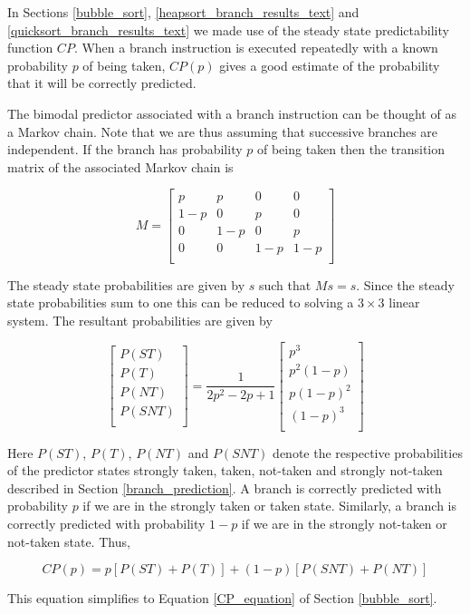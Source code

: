 \documentclass[acmtocl]{acmtrans2m}
\begin{document}
In Sections \ref{bubble_sort}, \ref{heapsort_branch_results_text} and \ref{quicksort_branch_results_text}
we made use of the steady state predictability function $CP$. When a branch instruction is executed 
repeatedly with a known probability $p$ of being taken, $CP(p)$ gives a good estimate of the probability
that it will be correctly predicted.

The bimodal predictor associated with a branch instruction can be thought
of as a Markov chain. Note that we are thus assuming that successive branches
are independent. If the branch has probability $p$ of being taken then 
the transition matrix of the associated Markov chain is

\[
M = 
\left[
\begin{array}{llll}
p   & p   & 0   & 0 \\
1-p & 0   & p   & 0 \\
0   & 1-p & 0   & p \\
0   & 0   & 1-p & 1-p \\
\end{array}
\right]
\] 

\noindent
The steady state probabilities are given by $s$ such that $Ms = s$.
Since the steady state probabilities sum to one this can be reduced to solving
a $3 \times 3$ linear system. The resultant probabilities are given by

\[
\left[ 
\begin{array}{c}
P(ST) \\
P(T) \\
P(NT) \\
P(SNT) \\
\end{array}
\right]
=
\frac{1}{2p^2 - 2p + 1}
\left[
\begin{array}{c}
p^3 \\
p^2(1 - p) \\
p(1 - p)^2 \\
(1 - p)^3 \\
\end{array}
\right]
\]

\noindent
Here $P(ST)$, $P(T)$, $P(NT)$ and $P(SNT)$ denote the respective probabilities of the predictor states strongly taken, taken, not-taken
and strongly not-taken described in Section \ref{branch_prediction}. A branch is correctly predicted with probability $p$ if we are 
in the strongly taken or taken state. Similarly, a branch is correctly predicted with probability $1 - p$ if we are in the strongly not-taken
or not-taken state. Thus,

\[
CP(p) = p\left[P(ST) + P(T)\right] + (1 - p)\left[P(SNT) + P(NT)\right]
\]

\noindent
This equation simplifies to Equation \ref{CP_equation} of Section \ref{bubble_sort}.


\begin{received}
\end{received}
\end{document}
